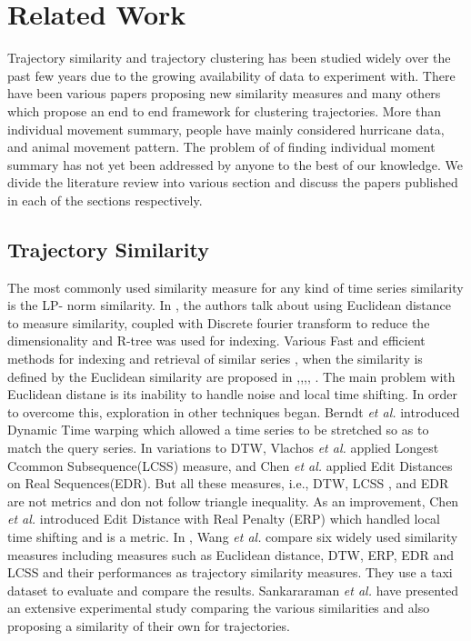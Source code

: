 \section{Related Work}
Trajectory similarity and trajectory clustering has been studied widely over the past few years due to the growing availability of data to experiment with. There have been various papers proposing new similarity measures and many others which propose an end to end framework for clustering trajectories. More than individual movement summary, people have mainly considered hurricane data, and animal movement pattern. The problem of of finding individual moment summary has not yet been addressed by anyone to the best of our knowledge. We divide the literature review into various section and discuss the papers published in each of the sections respectively.
\subsection{Trajectory Similarity}
The most commonly used similarity measure for any kind of time series similarity is the LP- norm similarity. In \cite{lp1}, the authors talk about using Euclidean distance to measure similarity, coupled with Discrete fourier transform to reduce the dimensionality and R-tree was used for indexing. Various Fast and efficient methods for indexing and retrieval of similar series , when the similarity is defined by the Euclidean similarity are proposed in \cite{lp1},\cite{lp2},\cite{lp3},\cite{lp4},\cite{lp5} . 
The main problem with Euclidean distane is its inability to handle noise and local time shifting. In order to overcome this, exploration in other techniques began. Berndt \emph{et al.} \cite{dtw} introduced Dynamic Time warping which allowed  a time series to be stretched so as to match the query series. In variations to DTW, Vlachos \emph{et al.} \cite{Vlachos2002} applied Longest Ccommon Subsequence(LCSS) measure, and Chen \emph{et al.}\cite{Chen2005} applied  Edit Distances on Real Sequences(EDR). But all these measures, i.e., DTW, LCSS , and EDR are not metrics and don not follow triangle inequality. As an improvement, Chen \emph{et al.}\cite{Chen2005} introduced Edit Distance with Real Penalty (ERP) which handled local time shifting and is a metric. In \cite{simcomp}, Wang \emph{et al.} compare six widely used similarity measures including measures such as Euclidean distance, DTW, ERP, EDR and LCSS and their performances as trajectory similarity measures. They use a taxi dataset to evaluate and compare the results. Sankararaman \emph{et al.} \cite{simcomp2} have presented an extensive experimental study comparing the various similarities and also proposing a similarity of their own for trajectories. 

